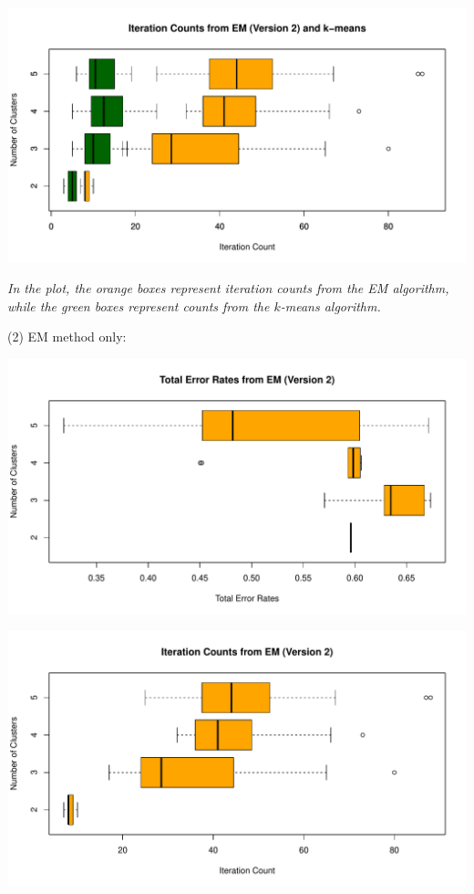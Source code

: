 \documentclass[a4paper,12pt]{article}
\begin{document}
\begin{center}
  \includegraphics[width=0.9\linewidth]{Image/Prob3-2-ItrCount-Ionosphere-Both.pdf}
  
   \parbox{0.9\textwidth}{\textit{In the plot, the \textcolor{myorange}{orange boxes} represent iteration counts from the EM algorithm, while the \textcolor{mydarkgreen}{green boxes} represent counts from the $k$-means algorithm. 
  }}
\end{center}
\bigskip

\noindent (2) EM method only:
\begin{center}
  \includegraphics[width=0.8\linewidth]{Image/Prob3-2-TotalErr-Ionosphere-EMFixed.pdf}
\end{center}
\begin{center}
  \includegraphics[width=0.8\linewidth]{Image/Prob3-2-ItrCount-Ionosphere-EMFixed.pdf}
\end{center}
\bigskip
\end{document}
